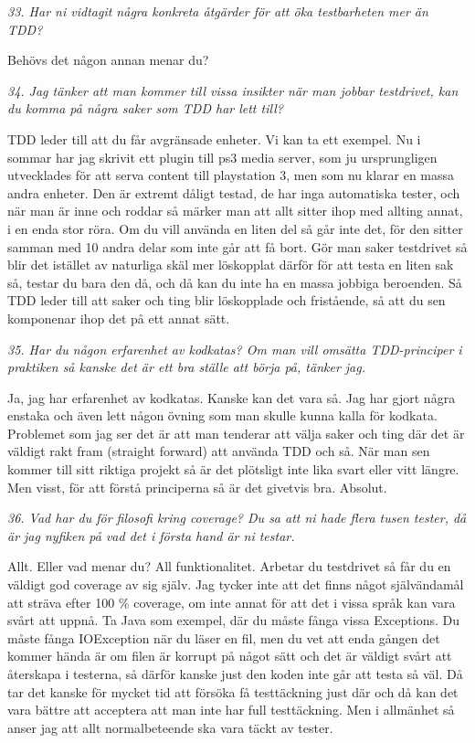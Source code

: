 \documentclass[11pt]{article}
\begin{document}
\emph{33. Har ni vidtagit några konkreta åtgärder för att öka testbarheten mer än TDD?}

Behövs det någon annan menar du?

\emph{34. Jag tänker att man kommer till vissa insikter när man jobbar testdrivet, kan du komma på några saker som TDD har lett till?}

TDD leder till att du får avgränsade enheter. Vi kan ta ett exempel. Nu i sommar har jag skrivit ett plugin till ps3 media server, som ju ursprungligen utvecklades för att serva content till playstation 3, men som nu klarar en massa andra enheter. Den är extremt dåligt testad, de har inga automatiska tester, och när man är inne och roddar så märker man att allt sitter ihop med allting annat, i en enda stor röra. Om du vill använda en liten del så går inte det, för den sitter samman med 10 andra delar som inte går att få bort. Gör man saker testdrivet så blir det istället av naturliga skäl mer löskopplat därför för att testa en liten sak så, testar du bara den då, och då kan du inte ha en massa jobbiga beroenden. Så TDD leder till att saker och ting blir löskopplade och fristående, så att du sen komponenar ihop det på ett annat sätt.

\emph{35. Har du någon erfarenhet av kodkatas? Om man vill omsätta TDD-principer i praktiken så kanske det är ett bra ställe att börja på, tänker jag.}

Ja, jag har erfarenhet av kodkatas. Kanske kan det vara så. Jag har gjort några enstaka och även lett någon övning som man skulle kunna kalla för kodkata. Problemet som jag ser det är att man tenderar att välja saker och ting där det är väldigt rakt fram (straight forward) att använda TDD och så. När man sen kommer till sitt riktiga projekt så är det plötsligt inte lika svart eller vitt längre. Men visst, för att förstå principerna så är det givetvis bra. Absolut.

\emph{36. Vad har du för filosofi kring coverage? Du sa att ni hade flera tusen tester, då är jag nyfiken på vad det i första hand är ni testar.}

Allt. Eller vad menar du? All funktionalitet. Arbetar du testdrivet så får du en väldigt god coverage av sig själv. Jag tycker inte att det finns något självändamål att sträva efter 100 \% coverage, om inte annat för att det i vissa språk kan vara svårt att uppnå. Ta Java som exempel, där du måste fånga vissa Exceptions. Du måste fånga IOException när du läser en fil, men du vet att enda gången det kommer hända är om filen är korrupt på något sätt och det är väldigt svårt att återskapa i testerna, så därför kanske just den koden inte går att testa så väl. Då tar det kanske för mycket tid att försöka få testtäckning just där och då kan det vara bättre att acceptera att man inte har full testtäckning. Men i allmänhet så anser jag att allt normalbeteende ska vara täckt av tester.
\end{document}
